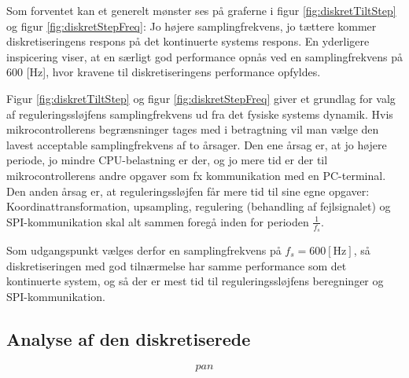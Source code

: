 Som forventet kan et generelt mønster ses på graferne i figur \ref{fig:diskretTiltStep} og figur \ref{fig:diskretStepFreq}:
Jo højere samplingfrekvens, jo tættere kommer diskretiseringens respons på det kontinuerte systems respons.
En yderligere inspicering viser, at en særligt god performance opnås ved en samplingfrekvens på 600 [Hz],
hvor kravene til diskretiseringens performance opfyldes.

Figur \ref{fig:diskretTiltStep} og figur \ref{fig:diskretStepFreq}
giver et grundlag for valg af reguleringssløjfens samplingfrekvens ud fra det fysiske systems dynamik.
Hvis mikrocontrollerens begrænsninger tages med i betragtning vil man vælge den lavest acceptable
samplingfrekvens af to årsager. Den ene årsag er, at jo højere periode, jo mindre CPU-belastning er der,
og jo mere tid er der til mikrocontrollerens andre opgaver som fx kommunikation med en PC-terminal.
Den anden årsag er, at reguleringssløjfen får mere tid til sine egne opgaver:
Koordinattransformation, upsampling, regulering (behandling af fejlsignalet) og SPI-kommunikation skal alt sammen foregå
inden for perioden \(\frac{1}{f_s}\).

Som udgangspunkt vælges derfor en samplingfrekvens på \(f_s=600 \mathrm{\left[Hz\right]}\),
så diskretiseringen med god tilnærmelse har samme performance som det kontinuerte system,
og så der er mest tid til reguleringssløjfens beregninger og SPI-kommunikation.

\subsection{Analyse af den diskretiserede}

\begin{equation}
	pan
	\label{eq:pantiltdiskretiserendetf} 
 \end{equation}
 
